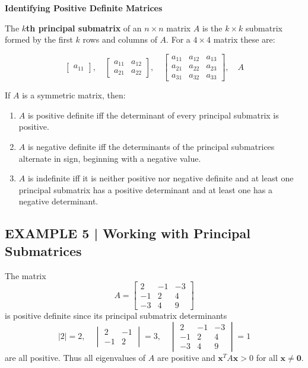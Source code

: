 \documentclass{article}
\newcommand{\redheading}[1]{{\vspace{2mm}\noindent\Large\bfseries\color{red!55!black} #1\par}\vspace{2mm}}
\begin{document}
\redheading{Identifying Positive Definite Matrices}

The \textbf{$k$th principal submatrix} of an $n\times n$ matrix $A$ is the $k\times k$ submatrix
formed by the first $k$ rows and columns of $A$. For a $4\times4$ matrix these are:

\[
  \begin{bmatrix}a_{11}\end{bmatrix},\quad
  \begin{bmatrix}a_{11}&a_{12}\\a_{21}&a_{22}\end{bmatrix},\quad
  \begin{bmatrix}a_{11}&a_{12}&a_{13}\\a_{21}&a_{22}&a_{23}\\a_{31}&a_{32}&a_{33}\end{bmatrix},\quad
  A
\]

\begin{tcolorbox}[colback=red!4, colframe=red!60!black,
  title={\textbf{Theorem 7.3.4}}, boxrule=0.5mm, arc=3mm]
If $A$ is a symmetric matrix, then:
\begin{enumerate}
  \item[(a)] $A$ is positive definite iff the determinant of every principal submatrix is positive.
  \item[(b)] $A$ is negative definite iff the determinants of the principal submatrices alternate
             in sign, beginning with a negative value.
  \item[(c)] $A$ is indefinite iff it is neither positive nor negative definite and at least one
             principal submatrix has a positive determinant and at least one has a negative
             determinant.
\end{enumerate}
\end{tcolorbox}

\subsection*{EXAMPLE 5 | Working with Principal Submatrices}

The matrix
\[
  A=\begin{bmatrix}2&-1&-3\\-1&2&4\\-3&4&9\end{bmatrix}
\]
is positive definite since its principal submatrix determinants
\[
  |2|=2,\quad
  \begin{vmatrix}2&-1\\-1&2\end{vmatrix}=3,\quad
  \begin{vmatrix}2&-1&-3\\-1&2&4\\-3&4&9\end{vmatrix}=1
\]
are all positive. Thus all eigenvalues of $A$ are positive and $\mathbf{x}^T A\mathbf{x}>0$
for all $\mathbf{x}\neq\mathbf{0}$.
\end{document}
